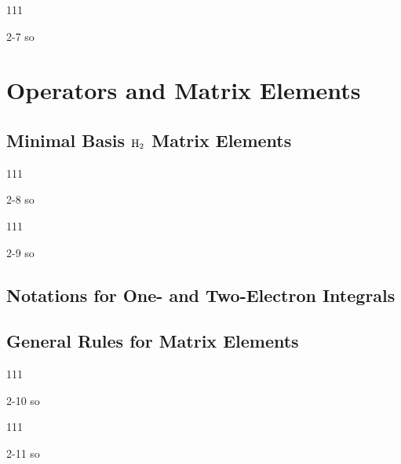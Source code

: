 \documentclass[a4paper]{book}
\begin{document}
	\begin{exercise}
	111
	\end{exercise}
	
	\begin{solution}
		2-7 so
	\end{solution}
	
	\section{Operators and Matrix Elements}
	
	\subsection{Minimal Basis \texorpdfstring{$\ce{H2}$}- Matrix Elements}
	
	\begin{exercise}
	111
	\end{exercise}
	
	\begin{solution}
		2-8 so
	\end{solution}
	
	\begin{exercise}
	111
	\end{exercise}
	
	\begin{solution}
		2-9 so
	\end{solution}
	
	\subsection{Notations for One- and Two-Electron Integrals}
	
	\subsection{General Rules for Matrix Elements}
	
	\begin{exercise}
	111
	\end{exercise}
	
	\begin{solution}
		2-10 so
	\end{solution}
	
	\begin{exercise}
	111
	\end{exercise}
	
	\begin{solution}
		2-11 so
	\end{solution}
	
\end{document}
